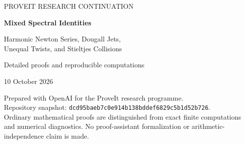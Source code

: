 \documentclass[11pt,a4paper]{article}
\numberwithin{equation}{section}
\theoremstyle{definition}
\theoremstyle{remark}
\newcommand{\src}[1]{\nolinkurl{#1}}
\begin{document}
\hypersetup{pageanchor=false}
\begin{titlepage}
\centering
\vspace*{18mm}
{\large\color{accent}PROVEIT RESEARCH CONTINUATION\par}
\vspace{11mm}
{\LARGE\bfseries\color{ink}Mixed Spectral Identities\par}
\vspace{7mm}
{\Large Harmonic Newton Series, Dougall Jets,\\[4pt]
Unequal Twists, and Stieltjes Collisions\par}
\vspace{13mm}
{\large Detailed proofs and reproducible computations\par}
\vspace{5mm}
{10 October 2026\par}
\vspace{13mm}
\begin{minipage}{0.88\textwidth}

\end{minipage}
\vfill
\begin{minipage}{0.88\textwidth}\small
Prepared with OpenAI for the ProveIt research programme.\\[4pt]
Repository snapshot:
\src{dcd95baeb7c0e914b138bddef6829c5b1d52b726}.\\[4pt]
Ordinary mathematical proofs are distinguished from exact finite
computations and numerical diagnostics. No proof-assistant
formalization or arithmetic-independence claim is made.
\end{minipage}
\end{titlepage}
\hypersetup{pageanchor=true}
\tableofcontents
\clearpage
{}

\clearpage

\clearpage

\clearpage

\clearpage

\clearpage

\clearpage

\end{document}
